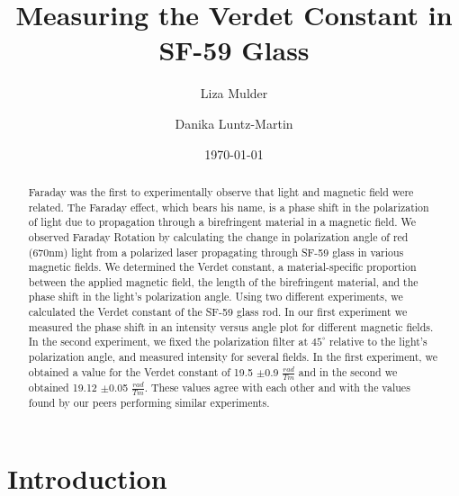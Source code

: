 \documentclass[prb,preprint]{revtex4-1}
\begin{document}

\title{Measuring the Verdet Constant in SF-59 Glass}


\author{Liza Mulder}


\author{Danika Luntz-Martin}


\date{\today}



\begin{abstract}

Faraday was the first to experimentally observe that light and magnetic field were related. The Faraday effect, which bears his name, is a phase shift in the polarization of light due to propagation through a birefringent material in a magnetic field. We observed Faraday Rotation by calculating the change in polarization angle of red (670nm) light from a polarized laser propagating through SF-59 glass in various magnetic fields. We determined the Verdet constant, a material-specific proportion between the applied magnetic field, the length of the birefringent material, and the phase shift in the light's polarization angle. Using two different experiments, we calculated the Verdet constant of the SF-59 glass rod. In our first experiment we measured the phase shift in an intensity versus angle plot for different magnetic fields.  In the second experiment, we fixed the polarization filter at $45^{\circ}$ relative to the light's polarization angle, and measured intensity for several fields. In the first experiment, we obtained a value for the Verdet constant of 19.5 $\pm$0.9 $\frac{rad}{Tm}$ and in the second we obtained 19.12 $\pm$0.05 $\frac{rad}{Tm}$. These values agree with each other and with the values found by our peers performing similar experiments. 

\end{abstract}

\maketitle %


\section{Introduction} %
\end{document}

